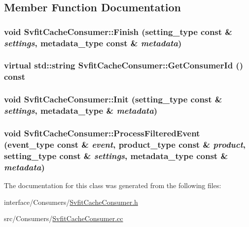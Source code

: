 \subsection{Member Function Documentation}
\hypertarget{classSvfitCacheConsumer_a09d12f89cab4026e1db359f5cec7513b}{
\subsubsection[{Finish}]{\setlength{\rightskip}{0pt plus 5cm}void SvfitCacheConsumer::Finish (setting\_\-type const \& {\em settings}, \/  metadata\_\-type const \& {\em metadata})}}
\label{classSvfitCacheConsumer_a09d12f89cab4026e1db359f5cec7513b}
\hypertarget{classSvfitCacheConsumer_af25bb531a14a514c695f5e6a729b3541}{
\subsubsection[{GetConsumerId}]{\setlength{\rightskip}{0pt plus 5cm}virtual std::string SvfitCacheConsumer::GetConsumerId () const}}
\label{classSvfitCacheConsumer_af25bb531a14a514c695f5e6a729b3541}
\hypertarget{classSvfitCacheConsumer_afcc829bb228ce3d9e736e2cab7749f65}{
\subsubsection[{Init}]{\setlength{\rightskip}{0pt plus 5cm}void SvfitCacheConsumer::Init (setting\_\-type const \& {\em settings}, \/  metadata\_\-type \& {\em metadata})}}
\label{classSvfitCacheConsumer_afcc829bb228ce3d9e736e2cab7749f65}
\hypertarget{classSvfitCacheConsumer_a2195cb133b9f45c844b28294dbc7f476}{
\subsubsection[{ProcessFilteredEvent}]{\setlength{\rightskip}{0pt plus 5cm}void SvfitCacheConsumer::ProcessFilteredEvent (event\_\-type const \& {\em event}, \/  product\_\-type const \& {\em product}, \/  setting\_\-type const \& {\em settings}, \/  metadata\_\-type const \& {\em metadata})}}
\label{classSvfitCacheConsumer_a2195cb133b9f45c844b28294dbc7f476}


The documentation for this class was generated from the following files:\begin{DoxyCompactItemize}
\item 
interface/Consumers/\hyperlink{SvfitCacheConsumer_8h}{SvfitCacheConsumer.h}\item 
src/Consumers/\hyperlink{SvfitCacheConsumer_8cc}{SvfitCacheConsumer.cc}\end{DoxyCompactItemize}
